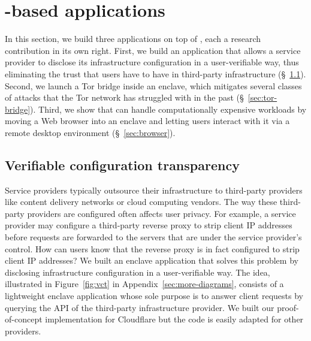\section{\Tool{}-based applications}%
\label{sec:applications}

In this section, we build three applications on top of \tool{}, each a research
contribution in its own right.
%
First, we build an application that allows a service provider to disclose its
infrastructure configuration in a user-verifiable way, thus eliminating the
trust that users have to have in third-party infrastructure (\S~\ref{sec:vct}).
%
Second, we launch a Tor bridge inside an enclave, which mitigates several
classes of attacks that the Tor network has struggled with in the past
(\S~\ref{sec:tor-bridge}).
%
Third, we show that \tool{} can handle computationally expensive workloads by
moving a Web browser into an enclave and letting users interact with it via a
remote desktop environment (\S~\ref{sec:browser}).

\subsection{Verifiable configuration transparency}%
\label{sec:vct}

Service providers typically outsource their infrastructure to third-party
providers like content delivery networks or cloud computing vendors.  The way
these third-party providers are configured often affects user privacy.  For
example, a service provider may configure a third-party reverse proxy to strip
client IP addresses before requests are forwarded to the servers that are under
the service provider's control.  How can users know that the reverse proxy is in
fact configured to strip client IP addresses?  We built an enclave application
that solves this problem by disclosing infrastructure configuration in a
user-verifiable way.  The idea, illustrated in Figure~\ref{fig:vct} in
Appendix~\ref{sec:more-diagrams}, consists of a lightweight enclave application
whose sole purpose is to answer client requests by querying the API of the
third-party infrastructure provider.  We built our proof-of-concept
implementation for Cloudflare but the code is easily adapted for other
providers.

